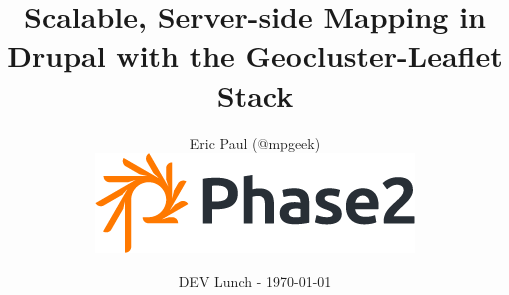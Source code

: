 \documentclass{beamer}
\begin{document}
\title[Large-Scale Mapping in Drupal with Geocluster \& Leaflet]{Scalable, Server-side Mapping in Drupal with the Geocluster-Leaflet Stack}  
\author[@mpgeek]{Eric Paul (@mpgeek)\\ \vspace{0.5em}\includegraphics[scale=0.25]{assets/p2-logo_small.jpg}}
\date{DEV Lunch - \today} 

\begin{frame} 
  \maketitle
\end{frame}




\end{document}
